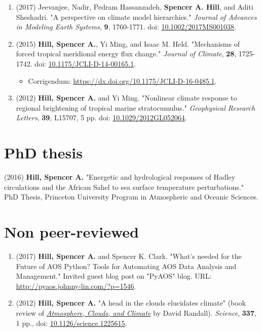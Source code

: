 \documentclass[12pt,letterpaper]{shillcv}
\begin{document}
\begin{enumerate}
\item (2017) Jeevanjee, Nadir, Pedram Hassanzadeh, \textbf{Spencer A. Hill}, and Aditi
Sheshadri.  "A perspective on climate model hierarchies."  \emph{Journal
of Advances in Modeling Earth Systems}, \textbf{9}, 1760-1771.  doi: \href{https://doi.org/10.1002/2017MS001038}{10.1002/2017MS001038}.
\item (2015) \textbf{Hill, Spencer A.}, Yi Ming, and Isaac M. Held.  "Mechanisms of forced
tropical meridional energy flux change."  \emph{Journal of Climate}, \textbf{28},
1725-1742.  doi: \href{http://dx.doi.org/10.1175/JCLI-D-14-00165.1}{10.1175/JCLI-D-14-00165.1}.
\begin{itemize}
\item Corrigendum: \url{https://dx.doi.org/10.1175/JCLI-D-16-0485.1}.
\end{itemize}
\item (2012) \textbf{Hill, Spencer A.} and Yi Ming.  "Nonlinear climate response to regional
brightening of tropical marine stratocumulus."  \emph{Geophysical Research Letters},
\textbf{39}, L15707, 5 pp. doi:
\href{http://dx.doi.org/10.1029/2012GL052064}{10.1029/2012GL052064}.
\end{enumerate}
\section*{PhD thesis}
\label{sec:org4ea0c2b}
(2016) \textbf{Hill, Spencer A.} "Energetic and hydrological responses of Hadley
circulations and the African Sahel to sea surface temperature perturbations."
PhD Thesis, Princeton University Program in Atmospheric and Oceanic Sciences.
\section*{Non peer-reviewed}
\label{sec:org67d12be}
\begin{enumerate}
\item (2017) \textbf{Hill, Spencer A.} and Spencer K. Clark.  "What’s needed for the Future
of AOS Python?  Tools for Automating AOS Data Analysis and Management."
Invited guest blog post on "PyAOS" blog.  URL:
\url{http://pyaos.johnny-lin.com/?p=1546}.
\item (2012) \textbf{Hill, Spencer A.}  "A head in the clouds elucidates climate" (book
review of \href{http://press.princeton.edu/titles/9773.html}{\emph{Atmosphere, Clouds, and Climate}} by David Randall). \emph{Science}, \textbf{337},
1 pp., doi: \href{http://dx.doi.org/10.1126/science.1225615}{10.1126/science.1225615}.
\end{enumerate}
\end{document}
